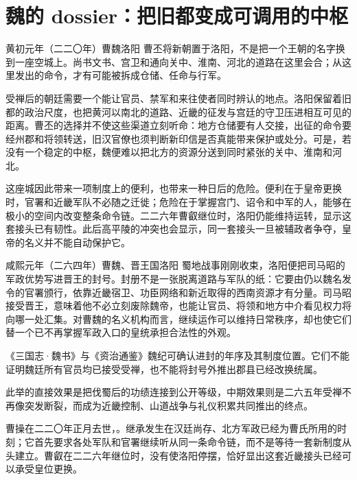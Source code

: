 \section{魏的 dossier：把旧都变成可调用的中枢}
\label{sec:wei-foundation-regency}

\begin{event}{}{黄初元年（二二〇年）}{曹魏}{洛阳}
曹丕将新朝置于洛阳，不是把一个王朝的名字换到一座空城上。尚书文书、宫卫和通向关中、淮南、河北的道路在这里会合；从这里发出的命令，才有可能被拆成仓储、任命与行军。

受禅后的朝廷需要一个能让官员、禁军和来往使者同时辨认的地点。洛阳保留着旧都的政治尺度，也把黄河以南北的道路、近畿的征发与宫廷的守卫压进相互可见的距离。曹丕的选择并不使这些渠道立刻听命：地方仓储要有人交接，出征的命令要经州郡和将领转送，旧汉官僚也须判断新印信是否真能带来保护或处分。可是，若没有一个稳定的中枢，魏便难以把北方的资源分送到同时紧张的关中、淮南和河北。

这座城因此带来一项制度上的便利，也带来一种日后的危险。便利在于皇帝更换时，官署和近畿军队不必随之迁徙；危险在于掌握宫门、诏令和中军的人，能够在极小的空间内改变整条命令链。二二六年曹叡继位时，洛阳仍能维持运转，显示这套接头已有韧性。此后高平陵的冲突也会显示，同一套接头一旦被辅政者争夺，皇帝的名义并不能自动保护它。
\end{event}




\begin{event}{}{咸熙元年（二六四年）}{曹魏、晋王国}{洛阳}
蜀地战事刚刚收束，洛阳便把司马昭的军政优势写进晋王的封号。封册不是一张脱离道路与军队的纸：它要由仍以魏名发令的官署颁行，依靠近畿宿卫、功臣网络和新近取得的西南资源才有分量。司马昭接受晋王，意味着他不必立刻废除魏帝，也能让官员、将领和地方中介看见权力将向哪一处汇集。对曹魏的名义机构而言，继续运作可以维持日常秩序，却也使它们替一个已不再掌握军政入口的皇统承担合法性的外观。

\begin{sourcenote}[晋王封号不能替魏廷各处表态]
《三国志·魏书》与《资治通鉴》魏纪可确认进封的年序及其制度位置。它们不能证明魏廷所有官员均已接受受禅，也不能将封号外推出郡县已经改换统属。
\end{sourcenote}
此举的直接效果是把伐蜀后的功绩连接到公开等级，中期效果则是二六五年受禅不再像突发断裂，而成为近畿控制、山道战争与礼仪积累共同推出的终点。
\end{event}
曹操在二二〇年正月去世，。继承发生在汉廷尚存、北方军政已经为曹氏所用的时刻；它首先要求各处军队和官署继续听从同一条命令链，而不是等待一套新制度从头建立。曹叡在二二六年继位时，没有使洛阳停摆，恰好显出这套近畿接头已经可以承受皇位更换。

